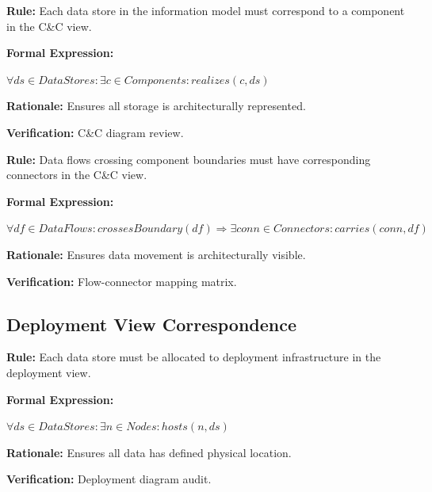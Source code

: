 \documentclass[11pt,letterpaper]{article}
\begin{document}
\begin{definitionbox}
\textbf{Rule:} Each data store in the information model must correspond to a component in the C\&C view.

\textbf{Formal Expression:}
\begin{center}
$\forall ds \in DataStores : \exists c \in Components : realizes(c, ds)$
\end{center}

\textbf{Rationale:} Ensures all storage is architecturally represented.

\textbf{Verification:} C\&C diagram review.
\end{definitionbox}

\begin{definitionbox}
\textbf{Rule:} Data flows crossing component boundaries must have corresponding connectors in the C\&C view.

\textbf{Formal Expression:}
\begin{center}
$\forall df \in DataFlows : crossesBoundary(df) \Rightarrow \exists conn \in Connectors : carries(conn, df)$
\end{center}

\textbf{Rationale:} Ensures data movement is architecturally visible.

\textbf{Verification:} Flow-connector mapping matrix.
\end{definitionbox}

\subsection{Deployment View Correspondence}

\begin{definitionbox}
\textbf{Rule:} Each data store must be allocated to deployment infrastructure in the deployment view.

\textbf{Formal Expression:}
\begin{center}
$\forall ds \in DataStores : \exists n \in Nodes : hosts(n, ds)$
\end{center}

\textbf{Rationale:} Ensures all data has defined physical location.

\textbf{Verification:} Deployment diagram audit.
\end{definitionbox}
\end{document}
